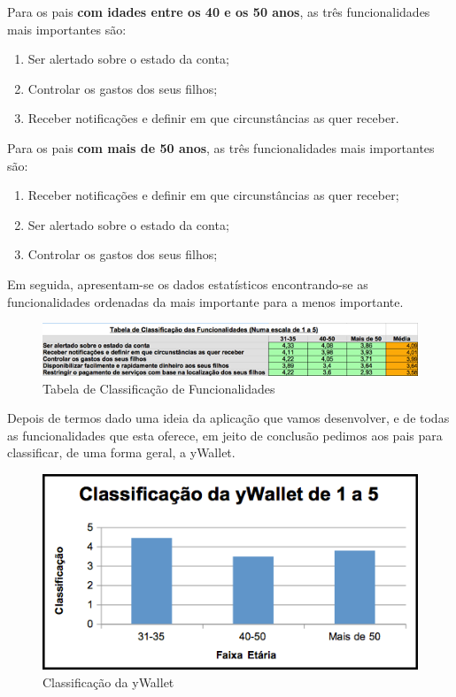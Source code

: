 \documentclass[12pt,a4paper]{article}
\begin{document}
      Para os pais \textbf{com idades entre os 40 e os 50 anos}, as três funcionalidades mais importantes são:

      \begin{enumerate}
        \item Ser alertado sobre o estado da conta;
        \item Controlar os gastos dos seus filhos;
        \item Receber notificações e definir em que circunstâncias as quer receber.
      \end{enumerate} 

      Para os pais \textbf{com mais de 50 anos}, as três funcionalidades mais importantes são:

      \begin{enumerate}
        \item Receber notificações e definir em que circunstâncias as quer receber;
        \item Ser alertado sobre o estado da conta;
        \item Controlar os gastos dos seus filhos;
      \end{enumerate}

      Em seguida, apresentam-se os dados estatísticos encontrando-se as funcionalidades ordenadas da mais importante para a menos importante.

      \begin{figure}[ht!]
        \centering
          \includegraphics[width=0.7\linewidth]{img/img12}
          \caption{Tabela de Classificação de Funcionalidades}
          \label{img12}
      \end{figure}

      Depois de termos dado uma ideia da aplicação que vamos desenvolver, e de todas as funcionalidades que esta oferece, em jeito de conclusão pedimos aos pais para classificar, de uma forma geral, a yWallet. 

      \begin{figure}[ht!]
        \centering
          \includegraphics[width=0.7\linewidth]{img/img13}
          \caption{Classificação da yWallet}
          \label{img13}
      \end{figure}
\end{document}
